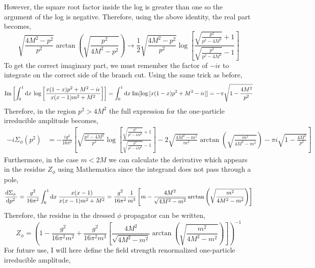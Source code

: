 \documentclass[12pt]{extarticle}
\begin{document}
However, the square root factor inside the log is greater than one so the argument of the log is negative. Therefore, using the above identity, the real part becomes,
\[\sqrt{\frac{4 M^2 - p^2}{p^2}} \arctan{\left(\sqrt{\frac{p^2}{4 M^2 - p^2}}\right)} \to \frac{1}{2} \sqrt{\frac{4 M^2 - p^2}{p^2}} \log{\left[ \frac{\sqrt{\frac{p^2}{p^2 - 4 M^2}} + 1}{\sqrt{\frac{p^2}{p^2 - 4 M^2}} - 1} \right]}\]
To get the correct imaginary part, we must remember the factor of $-i \epsilon$ to integrate on the correct side of the branch cut. Using the same trick as before,  
\[ \mathrm{Im} \left[ \int_{0}^{1} \mathrm{d}x \: \log{\left[\frac{x(1 - x) p^2 + M^2 - i \epsilon}{x(x - 1) m^2 + M^2} \right]} \right]  = \int_{0}^{1} \mathrm{d}x \: \mathrm{Im}[\log{[x(1 - x) p^2 + M^2 - i \epsilon]}] = - \pi \sqrt{1 - \frac{4 M^2}{p^2}} \]
Therefore, in the region $p^2 > 4 M^2$ the full expression for the one-particle irreducible amplitude becomes,
\begin{align*}
- i \Sigma_\phi(p^2) 
& = - \frac{ig^2}{16 \pi^2} \left[ \sqrt{\frac{p^2 - 4 M^2}{p^2}} \log{\left[ \frac{\sqrt{\frac{p^2}{p^2 - 4 M^2}} + 1}{\sqrt{\frac{p^2}{p^2 - 4 M^2}} - 1} \right]} - 2 \sqrt{\frac{4 M^2 - m^2}{m^2}} \arctan{\left(\sqrt{\frac{m^2}{4 M^2 - m^2}}\right)} - \pi i \sqrt{1 - \frac{4 M^2}{p^2}} \right]
\end{align*}
Furthermore, in the case $m < 2M$ we can calculate the derivative which appears in the residue $Z_\phi$ using Mathematica since the integrand does not pass through a pole,
\[ \frac{\mathrm{d}\Sigma_\phi \:}{\mathrm{d}p^2 \:} = \frac{g^2}{16 \pi^2} \int_{0}^1 \mathrm{d}x \: \frac{x(x-1)}{x(x-1)m^2 + M^2} 
=
\frac{g^2}{16 \pi^2} \frac{1}{m^3} \left[ m - \frac{4 M^2}{\sqrt{4 M^2 - m^2}} \arctan{\left( \sqrt{\frac{m^2}{4 M^2 - m^2}} \right)} \right] \]
Therefore, the residue in the dressed $\phi$ propagator can be written,
\[ Z_\phi = \left( 1 - \frac{g^2}{16 \pi^2 m^2} + \frac{g^2}{16 \pi^2 m^3} \left[ \frac{4 M^2}{\sqrt{4 M^2 - m^2}} \arctan{\left( \sqrt{\frac{m^2}{4 M^2 - m^2}} \right)} \right]  \right)^{-1} \]
For future use, I will here define the field strength renormalized one-particle irreducible amplitude,
\end{document}
